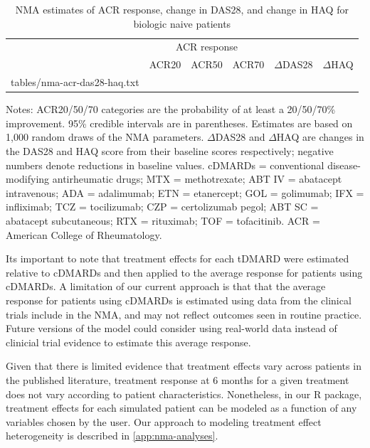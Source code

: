 \documentclass[11pt,final,fleqn]{article}\usepackage[]{graphicx}\usepackage[]{color}
\makeatletter
\theoremstyle{plain}
\newcommand*\ExpandableInput[1]{\@@input#1 }
\newcommand\R{{\textsf{R}}}
\makeatother
\begin{document}
\begin{table}
\begin{center}
\begin{threeparttable}
\caption{NMA estimates of ACR response, change in DAS28, and change in HAQ for biologic naive patients} \label{tbl:nma-acr-das28-haq}
\small
\begin{tabular}{lccccc}
\hline
\multicolumn{1}{c}{} & \multicolumn{3}{c}{ACR response} & \multicolumn{2}{c}{}\\
\cmidrule(lr){2-4} 
\multicolumn{1}{l}{} & \multicolumn{1}{c}{ACR20} & \multicolumn{1}{c}{ACR50} & \multicolumn{1}{c}{ACR70} & \multicolumn{1}{c}{$\Delta$DAS28} & \multicolumn{1}{c}{$\Delta$HAQ} \\
\hline
\ExpandableInput{tables/nma-acr-das28-haq.txt}
\hline
\end{tabular}
\scriptsize
Notes: ACR20/50/70 categories are the probability of at least a 20/50/70\% improvement. 95\% credible intervals are in parentheses. Estimates are based on 1,000 random draws of the NMA parameters. $\Delta$DAS28 and $\Delta$HAQ are changes in the DAS28 and HAQ score from their baseline scores respectively; negative numbers denote reductions in baseline values. cDMARDs = conventional disease-modifying antirheumatic drugs; MTX = methotrexate; ABT IV = abatacept intravenous; ADA = adalimumab; ETN = etanercept; GOL = golimumab; IFX = infliximab; TCZ = tocilizumab; CZP = certolizumab pegol; ABT SC = abatacept subcutaneous; RTX = rituximab; TOF = tofacitinib. ACR = American College of Rheumatology.
\end{threeparttable}
\end{center}
\end{table}

Its important to note that treatment effects for each tDMARD were estimated relative to cDMARDs and then applied to the average response for patients using cDMARDs. A limitation of our current approach is that that the average response for patients using cDMARDs is estimated using data from the clinical trials include in the NMA, and may not reflect outcomes seen in routine practice. Future versions of the model could consider using real-world data instead of clinicial trial evidence to estimate this average response.

Given that there is limited evidence that treatment effects vary across patients in the published literature, treatment response at 6 months for a given treatment does not vary according to patient characteristics. Nonetheless, in our \R{} package, treatment effects for each simulated patient can be modeled as a function of any variables chosen by the user. Our approach to modeling treatment effect heterogeneity is described in \autoref{app:nma-analyses}. 
\end{document}
